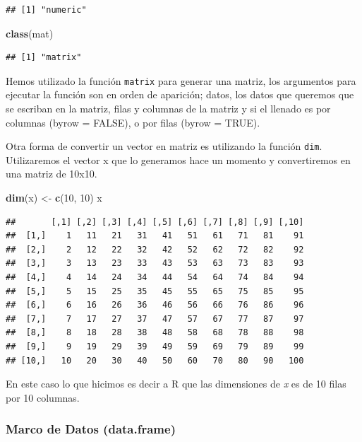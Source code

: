 \documentclass[]{article}
\newenvironment{Shaded}{\begin{snugshade}}{\end{snugshade}}
\newcommand{\KeywordTok}[1]{\textcolor[rgb]{0.13,0.29,0.53}{\textbf{{#1}}}}
\newcommand{\DecValTok}[1]{\textcolor[rgb]{0.00,0.00,0.81}{{#1}}}
\newcommand{\StringTok}[1]{\textcolor[rgb]{0.31,0.60,0.02}{{#1}}}
\newcommand{\NormalTok}[1]{{#1}}
\begin{document}
\begin{verbatim}
## [1] "numeric"
\end{verbatim}

\begin{Shaded}
\begin{Highlighting}[]
\KeywordTok{class}\NormalTok{(mat)}
\end{Highlighting}
\end{Shaded}

\begin{verbatim}
## [1] "matrix"
\end{verbatim}

Hemos utilizado la función \texttt{matrix} para generar una matriz, los
argumentos para ejecutar la función son en orden de aparición; datos,
los datos que queremos que se escriban en la matriz, filas y columnas de
la matriz y si el llenado es por columnas (byrow = FALSE), o por filas
(byrow = TRUE).

Otra forma de convertir un vector en matriz es utilizando la función
\texttt{dim}. Utilizaremos el vector x que lo generamos hace un momento
y convertiremos en una matriz de 10x10.

\begin{Shaded}
\begin{Highlighting}[]
\KeywordTok{dim}\NormalTok{(x) <-}\StringTok{ }\KeywordTok{c}\NormalTok{(}\DecValTok{10}\NormalTok{, }\DecValTok{10}\NormalTok{)}
\NormalTok{x}
\end{Highlighting}
\end{Shaded}

\begin{verbatim}
##       [,1] [,2] [,3] [,4] [,5] [,6] [,7] [,8] [,9] [,10]
##  [1,]    1   11   21   31   41   51   61   71   81    91
##  [2,]    2   12   22   32   42   52   62   72   82    92
##  [3,]    3   13   23   33   43   53   63   73   83    93
##  [4,]    4   14   24   34   44   54   64   74   84    94
##  [5,]    5   15   25   35   45   55   65   75   85    95
##  [6,]    6   16   26   36   46   56   66   76   86    96
##  [7,]    7   17   27   37   47   57   67   77   87    97
##  [8,]    8   18   28   38   48   58   68   78   88    98
##  [9,]    9   19   29   39   49   59   69   79   89    99
## [10,]   10   20   30   40   50   60   70   80   90   100
\end{verbatim}

En este caso lo que hicimos es decir a R que las dimensiones de \emph{x}
es de 10 filas por 10 columnas.

\subsubsection{Marco de Datos
(data.frame)}\label{marco-de-datos-data.frame}
\end{document}
